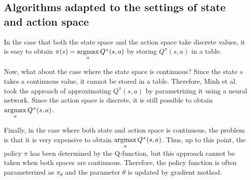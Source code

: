\documentclass[english, dvipdfmx]{ampmt}             %
\newcommand{\argmax}{\mathop{\rm argmax}\limits}
\begin{document}
\subsection{Algorithms adapted to the settings of state and action space}
\label{sec:policy_improvement}
In the case that both the state space and the action space take discrete values, it is easy to obtain
$\pi(s)=\argmax_aQ^{\pi}(s,a)$ by storing $Q^{\pi}(s,a)$ in a table.\par
Now, what about the case where the state space is continuous? Since the state $s$ takes a continuous value, it cannot be stored in a table. Therefore, Minh et al.\cite{DQN} took the approach of approximating $Q^{\pi}(s,a)$ by parametrizing it using a neural network. Since the action space is discrete, it is still possible to obtain $\argmax_aQ^{\pi}(s,a)$. \par
Finally, in the case where both state and action space is continuous, the problem is that it is very expensive to obtain $\argmax_aQ^{\pi}(s,a)$. Thus, up to this point, the policy $\pi$ has been determined by the Q-function, but this approach cannot be taken when both spaces are continuous. 
Therefore, the policy function is often parameterized as $\pi_{\theta}$ and the parameter $\theta$ is updated by gradient mothod. 
\end{document}

